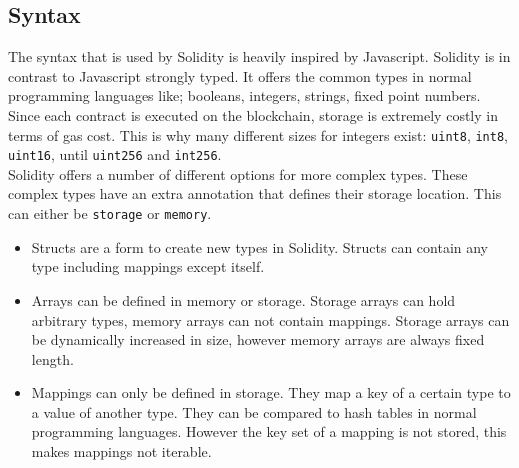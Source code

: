 \documentclass[a4paper]{article}
\begin{document}
\subsection{Syntax}
The syntax that is used by Solidity is heavily inspired by Javascript. Solidity is in contrast to Javascript strongly typed. It offers the common types in normal programming languages like; booleans, integers, strings, fixed point numbers. Since each contract is executed on the blockchain, storage is extremely costly in terms of gas cost. This is why many different sizes for integers exist: \texttt{uint8}, \texttt{int8}, \texttt{uint16}, until \texttt{uint256} and \texttt{int256}. \\
Solidity offers a number of different options for more complex types. These complex types have an extra annotation that defines their storage location. This can either be \texttt{storage} or \texttt{memory}. 
\begin{itemize}
    \item Structs are a form to create new types in Solidity. Structs can contain any type including mappings except itself.  
    \item Arrays can be defined in memory or storage. Storage arrays can hold arbitrary types, memory arrays can not contain mappings. Storage arrays can be dynamically increased in size, however memory arrays are always fixed length.  
    \item Mappings can only be defined in storage. They map a key of a certain type to a value of another type. They can be compared to hash tables in normal programming languages. However the key set of a mapping is not stored, this makes mappings not iterable. 
\end{itemize}
\end{document}
